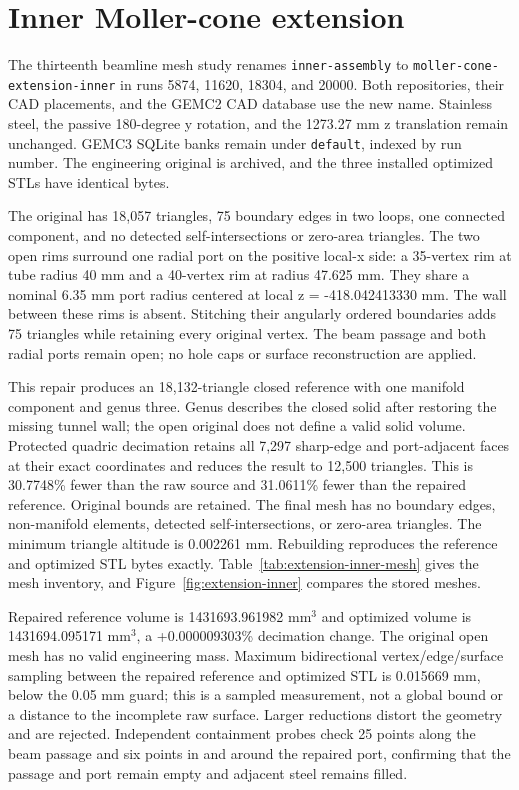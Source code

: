 \FloatBarrier
\section{Inner Moller-cone extension}
\label{sec:extension-inner}

The thirteenth beamline mesh study renames \texttt{inner-assembly} to
\texttt{moller-\allowbreak{}cone-\allowbreak{}extension-\allowbreak{}inner} in
runs 5874, 11620, 18304, and 20000. Both repositories, their CAD placements, and the GEMC2 CAD database use
the new name. Stainless steel, the passive 180-degree y rotation, and the 1273.27 mm z translation remain
unchanged. GEMC3 SQLite banks remain under \texttt{default}, indexed by run number. The engineering original
is archived, and the three installed optimized STLs have identical bytes.

The original has 18,057 triangles, 75 boundary edges in two loops, one connected component, and no detected
self-intersections or zero-area triangles. The two open rims surround one radial port on the positive local-x
side: a 35-vertex rim at tube radius 40 mm and a 40-vertex rim at radius 47.625 mm. They share a nominal 6.35
mm port radius centered at local z = -418.042413330 mm. The wall between these rims is absent. Stitching their
angularly ordered boundaries adds 75 triangles while retaining every original vertex. The beam passage and
both radial ports remain open; no hole caps or surface reconstruction are applied.

This repair produces an 18,132-triangle closed reference with one manifold component and genus three. Genus
describes the closed solid after restoring the missing tunnel wall; the open original does not define a valid
solid volume. Protected quadric decimation retains all 7,297 sharp-edge and port-adjacent faces at their exact
coordinates and reduces the result to 12,500 triangles. This is 30.7748\% fewer than the raw source and
31.0611\% fewer than the repaired reference. Original bounds are retained. The final mesh has no boundary
edges, non-manifold elements, detected self-intersections, or zero-area triangles. The minimum triangle
altitude is 0.002261 mm. Rebuilding reproduces the reference and optimized STL bytes exactly.
Table~\ref{tab:extension-inner-mesh} gives the mesh inventory, and Figure~\ref{fig:extension-inner} compares
the stored meshes.

Repaired reference volume is 1431693.961982 mm$^3$ and optimized volume is 1431694.095171 mm$^3$, a
+0.000009303\% decimation change. The original open mesh has no valid engineering mass. Maximum bidirectional
vertex/edge/surface sampling between the repaired reference and optimized STL is 0.015669 mm, below the 0.05
mm guard; this is a sampled measurement, not a global bound or a distance to the incomplete raw surface.
Larger reductions distort the geometry and are rejected. Independent containment probes check 25 points along
the beam passage and six points in and around the repaired port, confirming that the passage and port remain
empty and adjacent steel remains filled.

